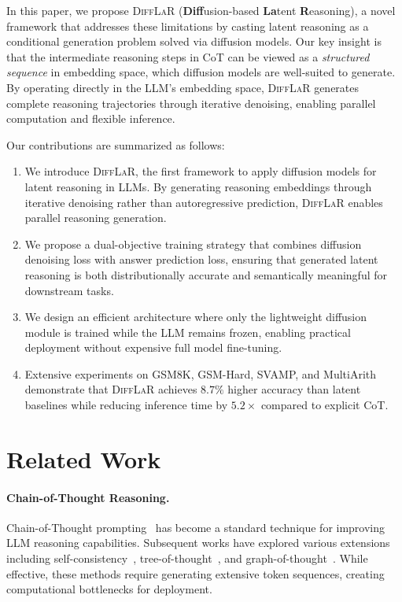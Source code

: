 \documentclass{article}
\newcommand{\difflar}{\textsc{DiffLaR}}
\begin{document}
In this paper, we propose \difflar{} (\textbf{Diff}usion-based \textbf{La}tent \textbf{R}easoning), a novel framework that addresses these limitations by casting latent reasoning as a conditional generation problem solved via diffusion models. Our key insight is that the intermediate reasoning steps in CoT can be viewed as a \emph{structured sequence} in embedding space, which diffusion models are well-suited to generate. By operating directly in the LLM's embedding space, \difflar{} generates complete reasoning trajectories through iterative denoising, enabling parallel computation and flexible inference.

Our contributions are summarized as follows:

\begin{enumerate}
    \item We introduce \difflar{}, the first framework to apply diffusion models for latent reasoning in LLMs. By generating reasoning embeddings through iterative denoising rather than autoregressive prediction, \difflar{} enables parallel reasoning generation.
    
    \item We propose a dual-objective training strategy that combines diffusion denoising loss with answer prediction loss, ensuring that generated latent reasoning is both distributionally accurate and semantically meaningful for downstream tasks.
    
    \item We design an efficient architecture where only the lightweight diffusion module is trained while the LLM remains frozen, enabling practical deployment without expensive full model fine-tuning.
    
    \item Extensive experiments on GSM8K, GSM-Hard, SVAMP, and MultiArith demonstrate that \difflar{} achieves $8.7\%$ higher accuracy than latent baselines while reducing inference time by $5.2\times$ compared to explicit CoT.
\end{enumerate}

\section{Related Work}
\label{sec:related}

\paragraph{Chain-of-Thought Reasoning.}
Chain-of-Thought prompting~\citep{wei2022chain} has become a standard technique for improving LLM reasoning capabilities. Subsequent works have explored various extensions including self-consistency~\citep{wang2022self}, tree-of-thought~\citep{yao2024tree}, and graph-of-thought~\citep{besta2024graph}. While effective, these methods require generating extensive token sequences, creating computational bottlenecks for deployment.
\end{document}
